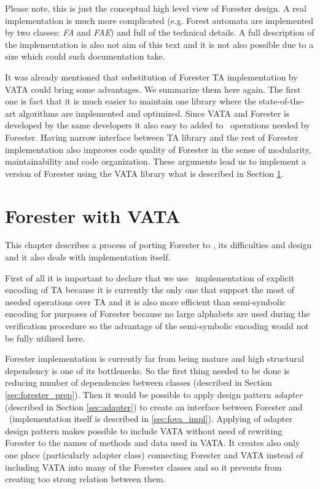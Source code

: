 Please note, this is just the conceptual high level view of Forester design.
A real implementation is much more complicated (e.g. Forest automata are implemented by two classes: \emph{FA} and \emph{FAE})
and full of the technical details.
A full description of the implementation is also not aim of this text and it is not
also possible due to a size which could such documentation take.

It was already mentioned that substitution of Forester TA implementation by
VATA could bring some advantages.
We summarize them here again.
The first one is fact that it is much easier to maintain one library where
the state-of-the-art algorithms are implemented and optimized.
Since VATA and Forester is developed by the same developers it also easy to added
to \vata\ operations needed by Forester.
Having narrow interface between TA library and the rest of Forester implementation
also improves code quality of Forester in the sense of modularity, maintainability and code organization.
These arguments lead us to implement a version of Forester using the VATA library what is described in Section \ref{ch:fova}.

\chapter{Forester with VATA}
\label{ch:fova}

This chapter describes a process of porting Forester to \vata, its difficulties and design and it also deals with implementation
itself.

First of all it is important to declare that we use \vata\ implementation of explicit encoding of TA because
it is currently the only one that support the most of needed operations over TA and it is also more efficient than
semi-symbolic encoding for purposes of Forester because no large alphabets are used during the verification procedure
so the advantage of the semi-symbolic encoding would not be fully utilized here.

Forester implementation is currently far from being mature and high structural dependency is
one of its bottlenecks.
So the first thing needed to be done is reducing number of dependencies between classes (described in Section \ref{sec:forester_prep}).
Then it would be possible to apply design pattern \emph{adapter} \cite{gamma95} (described in Section \ref{sec:adapter}) to create
an interface between Forester and \vata\ (implementation itself is described in \ref{sec:fova_impl}).
Applying of adapter design pattern makes possible to include VATA without need of rewriting
Forester to the names of methods and data used in VATA.
It creates also only one place (particularly adapter class) connecting Forester and VATA instead of
including VATA into many of the Forester classes and so it prevents from creating too strong relation between them.

